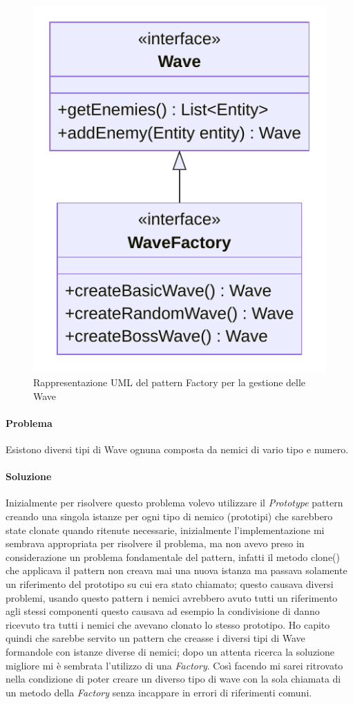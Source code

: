 \documentclass[a4paper,12pt]{report}
\begin{document}
\begin{figure}[H]
\centering{}
\includegraphics[scale=0.75]{img/WaveUML}
\caption{Rappresentazione UML del pattern Factory per la gestione delle Wave}
\label{img:wave}
\end{figure}

\paragraph{Problema} Esistono diversi tipi di Wave ognuna composta da nemici di vario tipo e numero.

\paragraph{Soluzione} Inizialmente per risolvere questo problema volevo utilizzare il \textit{Prototype} pattern creando una singola istanze per ogni tipo di nemico (prototipi) che sarebbero state clonate quando ritenute necessarie, inizialmente l’implementazione mi sembrava appropriata per risolvere il problema, ma non avevo preso in considerazione un problema fondamentale del pattern, infatti il metodo clone() che applicava il pattern non creava mai una nuova istanza ma passava solamente un riferimento del prototipo su cui era stato chiamato; questo causava diversi problemi, usando questo pattern i nemici avrebbero avuto tutti un riferimento agli stessi componenti questo causava ad esempio la condivisione di danno ricevuto tra tutti i nemici che avevano clonato lo stesso prototipo.
Ho capito quindi che sarebbe servito un pattern che creasse i diversi tipi di Wave formandole con istanze diverse di nemici; dopo un attenta ricerca la soluzione migliore mi è sembrata l’utilizzo di una \textit{Factory}. Così facendo mi sarei ritrovato nella condizione di poter creare un diverso tipo di wave con la sola chiamata di un metodo della \textit{Factory} senza incappare in errori di riferimenti comuni.
\end{document}
